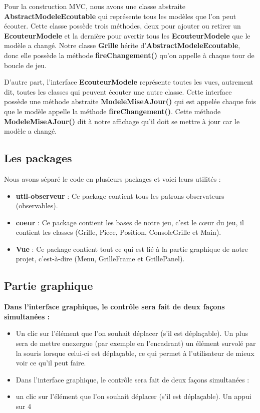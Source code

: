 \documentclass[a4paper,10pt]{article}
\begin{document}
Pour la construction MVC, nous avons une classe abstraite \textbf{AbstractModeleEcoutable} qui représente tous les modèles que l'on peut écouter. Cette classe possède trois méthodes, deux pour ajouter ou retirer un \textbf{EcouteurModele} et la dernière pour avertir tous les \textbf{EcouteurModele} que le modèle a changé. Notre classe \textbf{Grille} hérite d'\textbf{AbstractModeleEcoutable}, donc elle possède la méthode \textbf{fireChangement()} qu'on appelle à chaque tour de boucle de jeu.

D'autre part, l'interface \textbf{EcouteurModele} représente toutes les vues, autrement dit, toutes les classes qui peuvent écouter une autre classe. Cette interface possède une méthode abstraite \textbf{ModeleMiseAJour()} qui est appelée chaque fois que le modèle appelle la méthode \textbf{fireChangement()}. Cette méthode \textbf{ModeleMiseAJour()} dit à notre affichage qu'il doit se mettre à jour car le modèle a changé.

\subsection{Les packages}
Nous avons séparé le code en plusieurs packages et voici leurs utilités :

\begin{itemize}
\item \textbf{util-observeur} : Ce package contient tous les patrons observateurs (observables).

\item \textbf{coeur} : Ce package contient les bases de notre jeu, c'est le cœur du jeu, il contient les classes (Grille, Piece, Position, ConsoleGrille et Main).

\item \textbf{Vue} : Ce package contient tout ce qui est lié à la partie graphique de notre projet, c'est-à-dire (Menu, GrilleFrame et GrillePanel).
\end{itemize}

\subsection{Partie graphique}

\textbf{Dans l'interface graphique, le contrôle sera fait de deux façons simultanées :} \\

\begin{itemize}

\item Un clic sur l'élément que l'on souhait déplacer (s'il est déplaçable). Un plus sera de mettre enexergue (par exemple en l'encadrant) un élément survolé par la souris lorsque celui-ci est déplaçable, ce qui permet à l'utilisateur de mieux voir ce qu'il peut faire.

\item Dans l'interface graphique, le contrôle sera fait de deux façons simultanées :

\item un clic sur l'élément que l'on souhait déplacer (s'il est déplaçable). Un appui sur 4

\end{itemize} 
\end{document}
